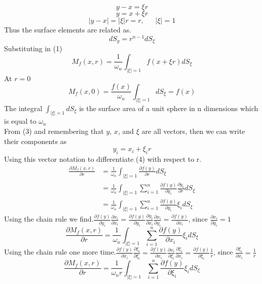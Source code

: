 \documentclass[]{article}
\begin{document}
\[
    y-x = \xi r    
\]
\begin{equation}
y = x + \xi r
\end{equation}
\[
    |y-x| = |\xi|r = r, \quad\;\; |\xi| = 1    
\]
Thus the surface elements are related as.
\[
    dS_y = r^{n-1} dS_\xi    
\]
Substituting in (1)
\begin{equation}
M_{f}(x,r) = \frac{1}{\omega_{n}} \int_{|\xi|=1} f(x+\xi r)dS_\xi
\end{equation} 
At $r = 0$
\begin{equation}
M_{f}(x,0) = \frac{f(x)}{\omega_{n}} \int_{|\xi|=1} dS_\xi = f(x)
\end{equation}
The integral $\displaystyle \int_{|\xi|=1} dS_\xi$ is the surface area of a unit sphere in n dimensions which is equal to $\omega_n$
\\
From (3) and remembering that $y$, $x$, and $\xi$ are all vectors, then we can write their components as
\[
    y_i = x_i + \xi_i r    
\]
Using this vector notation to differentiate (4) with respect to r.
\begin{align*}
\frac{\partial M_f (x,r)}{\partial r} &= \frac{1}{\omega_n} \int_{|\xi|=1} \frac{\partial f(y)}{\partial r}dS_\xi
\\
&= \frac{1}{\omega_n} \int_{|\xi|=1} \sum_{i=1}^{n} \frac{\partial f(y)}{\partial y_i}\frac{\partial y_i}{\partial r} dS_\xi
\\
&= \frac{1}{\omega_n} \int_{|\xi|=1} \sum_{i=1}^{n} \frac{\partial f(y)}{\partial y_i}\xi_i dS_\xi
\end{align*}
Using the chain rule we find.$\displaystyle \frac{\partial f(y)}{\partial y_i} \frac{\partial x_i}{\partial x_i} = \frac{\partial f(y)}{\partial y_i} \frac{\partial y_i}{\partial x_i}\frac{\partial x_i}{\partial y_i} = \frac{\partial f(y)}{\partial x_i}$, since $\displaystyle \frac{\partial x_i}{\partial y_i} = 1$
\[
    \frac{\partial M_f (x,r)}{\partial r} = \frac{1}{\omega_n} \int_{|\xi|=1} \sum_{i=1}^{n} \frac{\partial f(y)}{\partial x_i}\xi_i dS_\xi    
\]
Using the chain rule one more time.$\displaystyle \frac{\partial f(y)}{\partial x_i} \frac{\partial \xi_i}{\partial \xi_i}= \frac{\partial f(y)}{\partial x_i}\frac{\partial x_i}{\partial \xi_i}\frac{\partial \xi_i}{\partial x_i} = \frac{\partial f(y)}{\partial \xi_i}\frac{1}{r}$, since $\displaystyle \frac{\partial \xi_i}{\partial x_i} = \frac{1}{r}$
\begin{equation}
\frac{\partial M_f (x,r)}{\partial r} = \frac{1}{\omega_n r} \int_{|\xi|=1} \sum_{i=1}^{n} \frac{\partial f(y)}{\partial \xi_i}\xi_i dS_\xi
\end{equation}
\end{document}
